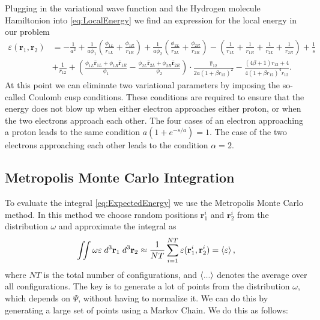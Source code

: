\documentclass[twoside]{article}
\newcommand{\bfr}{\ensuremath{\mathbf{r}}}
\begin{document}
Plugging in the variational wave function and the Hydrogen molecule Hamiltonion into \eqref{eq:LocalEnergy} we find an expression for the local energy in our problem
\begin{equation}
\begin{split}
\varepsilon(\bfr_1,\bfr_2) &= 
-\frac{1}{a^2} 
+ \frac{1}{a\phi_1} \left(\frac{\phi_{1L}}{r_{1L}} + \frac{\phi_{1R}}{r_{1R}}\right) 
+ \frac{1}{a\phi_2} \left(\frac{\phi_{2L}}{r_{2L}} + \frac{\phi_{2R}}{r_{2R}}\right)
- \left( \frac{1}{r_{1L}}+\frac{1}{r_{1R}}+\frac{1}{r_{2L}}+\frac{1}{r_{2R}} \right) + \frac{1}{s} \\
&+ \frac{1}{r_{12}} 
+ \left( \frac{\phi_{1L}\hat{\bfr}_{1L} + \phi_{1R}\hat{\bfr}_{1R}}{\phi_1} - \frac{\phi_{2L}\hat{\bfr}_{2L} + \phi_{2R}\hat{\bfr}_{2R}}{\phi_2} \right) \cdot \frac{\hat{\bfr}_{12}}{2a(1+\beta r_{12})^2} 
- \frac{(4\beta+1)r_{12}+4}{4(1+\beta r_{12})^4 r_{12}}. 
\end{split}
\end{equation}
At this point we can eliminate two variational parameters by imposing the so-called Coulomb cusp conditions. These conditions are required to ensure that the energy does not blow up when either electron approaches either proton, or when the two electrons approach each other. The four cases of an electron approaching a proton leads to the same condition $a(1+e^{-s/a}) = 1$. The case of the two electrons approaching each other leads to the condition $\alpha = 2$.

\subsection{Metropolis Monte Carlo Integration}\label{sec:metropolis}
To evaluate the integral \eqref{eq:ExpectedEnergy} we use the Metropolis Monte Carlo method. In this method we choose random positions $\bfr_1^i$ and $\bfr_2^i$ from the distribution $\omega$ and approximate the integral as
\begin{equation}
\iint \omega \varepsilon \; d^3\bfr_1 \; d^3\bfr_2 \approx \frac{1}{NT} \sum_{i=1}^{NT} \varepsilon(\bfr_1^i,\bfr_2^i) = \braket{\varepsilon},
\end{equation}
where $NT$ is the total number of configurations, and $\braket{...}$ denotes the average over all configurations. The key is to generate a lot of points from the distribution $\omega$, which depends on $\Psi$, without having to normalize it. We can do this by generating a large set of points using a Markov Chain. We do this as follows:
\end{document}
